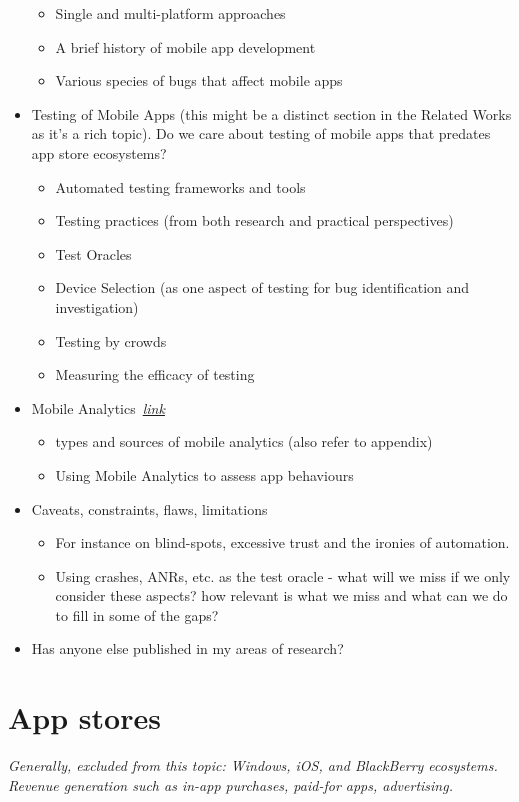 \begin{itemize}
    \begin{itemize}
        \item Single and multi-platform approaches
        \item A brief history of mobile app development
        \item Various species of bugs that affect mobile apps
    \end{itemize}
    \item Testing of Mobile Apps (this might be a distinct section in the Related Works as it's a rich topic). Do we care about testing of mobile apps that predates app store ecosystems?
    \begin{itemize}
        \item Automated testing frameworks and tools
        \item Testing practices (from both research and practical perspectives)
        \item Test Oracles
        \item Device Selection (as one aspect of testing for bug identification and investigation)
        \item Testing by crowds
        \item Measuring the efficacy of testing
    \end{itemize}
    \item Mobile Analytics~\hyperlink{mobile.analytics}{\emph{link}}
    \begin{itemize}
        \item types and sources of mobile analytics (also refer to appendix)
        \item Using Mobile Analytics to assess app behaviours
    \end{itemize}
    \item Caveats, constraints, flaws, limitations
    \begin{itemize}
        \item For instance on blind-spots, excessive trust and the ironies of automation. 
        \item Using crashes, ANRs, etc. as the test oracle - what will we miss if we only consider these aspects? how relevant is what we miss and what can we do to fill in some of the gaps?
    \end{itemize}
    \item Has anyone else published in my areas of research?
\end{itemize}

\section{App stores}
\textit{Generally, excluded from this topic: Windows, iOS, and BlackBerry ecosystems. Revenue generation such as in-app purchases, paid-for apps, advertising.} 

